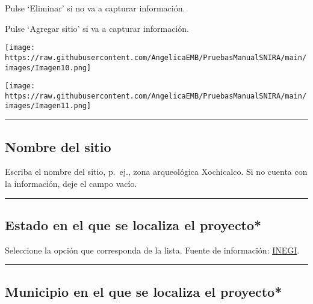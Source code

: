 \documentclass[
]{book}
\begin{document}
Pulse `Eliminar' si no va a capturar información.

Pulse `Agregar sitio' si va a capturar información.

\texttt{[image: https://raw.githubusercontent.com/AngelicaEMB/PruebasManualSNIRA/main/images/Imagen10.png]}

\texttt{[image: https://raw.githubusercontent.com/AngelicaEMB/PruebasManualSNIRA/main/images/Imagen11.png]}

\begin{center}\rule{0.5\linewidth}{0.5pt}\end{center}

\hypertarget{nombre-del-sitio}{%
\subsection*{Nombre del sitio}\label{nombre-del-sitio}}

Escriba el nombre del sitio, p.~ej., zona arqueológica Xochicalco.
Si no cuenta con la información, deje el campo vacío.

\begin{center}\rule{0.5\linewidth}{0.5pt}\end{center}

\hypertarget{estado-en-el-que-se-localiza-el-proyecto}{%
\subsection*{\texorpdfstring{{Estado en el que se localiza el proyecto*}}{Estado en el que se localiza el proyecto*}}\label{estado-en-el-que-se-localiza-el-proyecto}}

Seleccione la opción que corresponda de la lista.
Fuente de información: \href{https://www.inegi.org.mx/app/ageeml/}{INEGI}.

\begin{center}\rule{0.5\linewidth}{0.5pt}\end{center}

\hypertarget{municipio-en-el-que-se-localiza-el-proyecto}{%
\subsection*{\texorpdfstring{{Municipio en el que se localiza el proyecto*}}{Municipio en el que se localiza el proyecto*}}\label{municipio-en-el-que-se-localiza-el-proyecto}}
\end{document}
